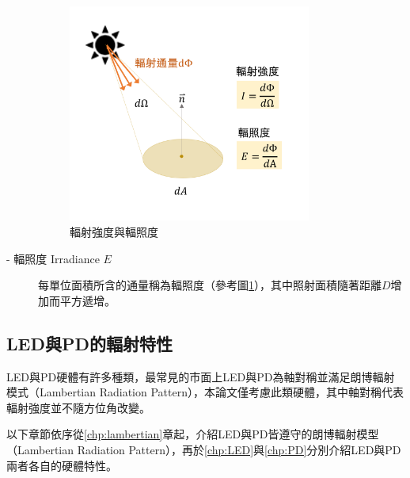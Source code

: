\begin{description}
                \begin{figure}[ht]
                    \centering
                    \includegraphics[width=8cm]{ch2pic/intensity_irradiance.png}
                    \caption{輻射強度與輻照度}
                    \label{pic:intensity_irradiance}
                \end{figure}

            \item[- 輻照度 Irradiance $E$] \hfill
                
                \qquad
                每單位面積所含的通量稱為輻照度（參考圖\ref{pic:intensity_irradiance}），其中照射面積隨著距離$D$增加而平方遞增。

                
             
        \end{description}

        

        

    \subsection{LED與PD的輻射特性}
    \label{chp:LEDPD_radiate}

    LED與PD硬體有許多種類，最常見的市面上LED與PD為軸對稱並滿足朗博輻射模式（Lambertian Radiation Pattern），本論文僅考慮此類硬體，其中軸對稱代表輻射強度並不隨方位角改變。

    以下章節依序從\ref{chp:lambertian}章起，介紹LED與PD皆遵守的朗博輻射模型（Lambertian Radiation Pattern），再於\ref{chp:LED}與\ref{chp:PD}分別介紹LED與PD兩者各自的硬體特性。
    
